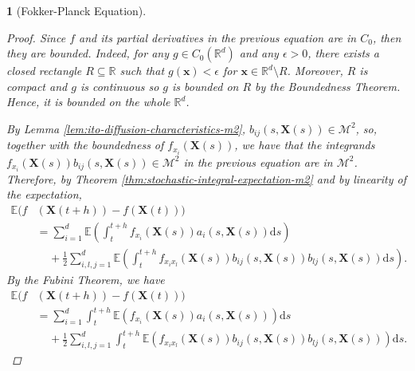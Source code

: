 \documentclass[english]{article}
\numberwithin{equation}{section}
\numberwithin{figure}{section}
\theoremstyle{bolddescit}
\newtheorem{theorem}{\protect\theoremname}[section]
\theoremstyle{definition}
\theoremstyle{definition}
\theoremstyle{plain}
\theoremstyle{plain}
\theoremstyle{bolddesc}
\theoremstyle{plain}
\theoremstyle{remark}
\providecommand{\theoremname}{Theorem}
\begin{document}
\begin{theorem}[Fokker-Planck Equation]
\begin{proof}
    Since $f$ and its partial derivatives in the previous equation are in $C_0$, then they are bounded. Indeed, for any $g \in C_0(\mathbb{R}^d)$ and any $\epsilon > 0$, there exists a closed rectangle $R \subseteq \mathbb{R}$ such that $g(\mathbf{x}) < \epsilon$ for $\mathbf{x} \in \mathbb{R}^d \setminus R$. Moreover, $R$ is compact and $g$ is continuous so $g$ is bounded on $R$ by the Boundedness Theorem. Hence, it is bounded on the whole $\mathbb{R}^d$.

    By Lemma \ref{lem:ito-diffusion-characteristics-m2}, $b_{ij}(s,\mathbf{X}(s)) \in \mathcal{M}^2$, so, together with the boundedness of $f_{x_i}(\mathbf{X}(s))$, we have that the integrands $f_{x_i}(\mathbf{X}(s))b_{ij}(s,\mathbf{X}(s)) \in \mathcal{M}^2$ in the previous equation are in $\mathcal{M}^2$. Therefore, by Theorem \ref{thm:stochastic-integral-expectation-m2} and by linearity of the expectation,
    \begin{align*}
      \mathbb{E}(f&(\mathbf{X}(t+h)) - f(\mathbf{X}(t)))\\
      &= \sum_{i=1}^{d} \mathbb{E}\left(\int_t^{t+h} f_{x_i}(\mathbf{X}(s)) a_i(s,\mathbf{X}(s)) \mathrm{d}s\right)\\
        &\ \ \ \ \ + \frac{1}{2} \sum_{i,l,j=1}^{d} \mathbb{E}\left(\int_t^{t+h} f_{x_i x_l}(\mathbf{X}(s)) b_{ij}(s,\mathbf{X}(s)) b_{lj}(s,\mathbf{X}(s)) \mathrm{d}s\right).
    \end{align*}
    By the Fubini Theorem, we have
    \begin{align*}
      \mathbb{E}(f&(\mathbf{X}(t+h)) - f(\mathbf{X}(t)))\\
      &= \sum_{i=1}^{d} \int_t^{t+h} \mathbb{E}(f_{x_i}(\mathbf{X}(s)) a_i(s,\mathbf{X}(s))) \mathrm{d}s\\
        &\ \ \ \ \ + \frac{1}{2} \sum_{i,l,j=1}^{d} \int_t^{t+h} \mathbb{E}\left(f_{x_i x_l}(\mathbf{X}(s)) b_{ij}(s,\mathbf{X}(s)) b_{lj}(s,\mathbf{X}(s))\right) \mathrm{d}s.
    \end{align*}


\end{proof}
\end{theorem}
\end{document}
